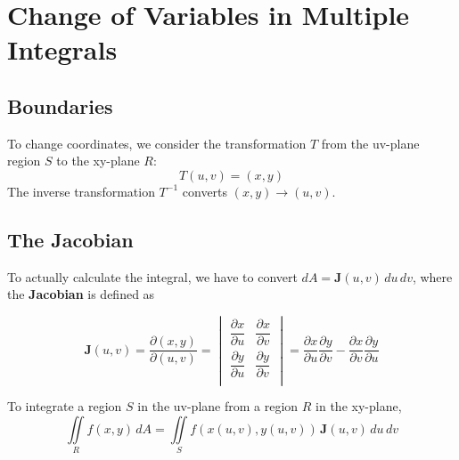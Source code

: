 \documentclass{report}  %
\begin{document}
\section{Change of Variables in Multiple Integrals}
\subsection*{Boundaries}
To change coordinates, we consider the transformation $T$ from the uv-plane region $S$ to the xy-plane $R$:
$$T(u,v) = (x,y)$$
The inverse transformation $T^{-1}$ converts $(x, y) \to (u, v)$. 

\subsection*{The Jacobian}
To actually calculate the integral, we have to convert $dA = \mathbf{J}(u,v) \, du \, dv$,
where the \textbf{Jacobian} is defined as

\begin{equation}
	\mathbf{J}(u,v) = 
	\frac{\partial (x,y)}{\partial (u,v)} = 
	\begin{vmatrix}
		\dfrac{\partial x}{\partial u}& \dfrac{\partial x}{\partial v}\\[1em]
		\dfrac{\partial y}{\partial u}& \dfrac{\partial y}{\partial v}\\
	\end{vmatrix}
	= \frac{\partial x}{\partial u} \frac{\partial y}{\partial v} - 
	  \frac{\partial x}{\partial v} \frac{\partial y}{\partial u}
\end{equation}

To integrate a region $S$ in the uv-plane from a region $R$ in the xy-plane, 
\begin{equation}
	\iint \limits_R f(x,y) \, dA = \iint \limits_S f(x(u,v), y(u,v)) \,
	\mathbf{J}(u,v) \, du \, dv
\end{equation}
\end{document}
